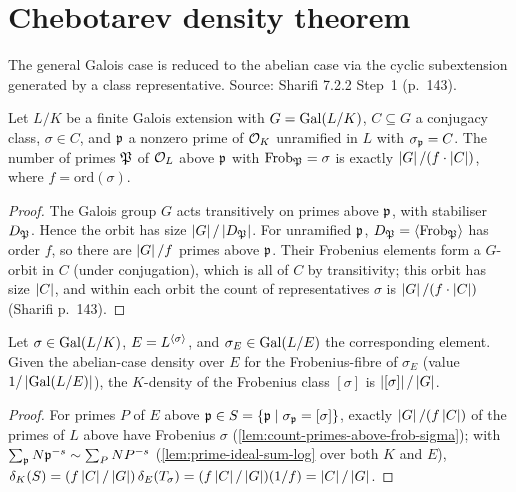 \section{Chebotarev density theorem}

The general Galois case is reduced to the abelian case via the cyclic
subextension generated by a class representative. Source: Sharifi 7.2.2
Step~1 (p.~143).

\begin{lemma}\label{lem:count-primes-above-frob-sigma}
  Let $L/K$ be a finite Galois extension with $G=\mathrm{Gal}(L/K)$,
  $C\subseteq G$ a conjugacy class, $\sigma\in C$, and $\mathfrak{p}$ a nonzero
  prime of $\mathcal{O}_K$ unramified in $L$ with $\sigma_{\mathfrak{p}} = C$. The number
  of primes $\mathfrak{P}$ of $\mathcal{O}_L$ above $\mathfrak{p}$ with $\mathrm{Frob}_{\mathfrak{P}} = \sigma$
  is exactly $\left\lvert G \right\rvert/(f\cdot\left\lvert C \right\rvert)$, where $f = \mathrm{ord}(\sigma)$.
\end{lemma}

\begin{proof}
  The Galois group $G$ acts transitively on primes above $\mathfrak{p}$, with
  stabiliser $D_{\mathfrak{P}}$. Hence the orbit has size $\left\lvert G \right\rvert/\left\lvert D_{\mathfrak{P}} \right\rvert$. For
  unramified $\mathfrak{p}$, $D_{\mathfrak{P}}=\left\langle \mathrm{Frob}_{\mathfrak{P}} \right\rangle$ has order $f$, so there are
  $\left\lvert G \right\rvert/f$ primes above $\mathfrak{p}$. Their Frobenius elements form a
  $G$-orbit in $C$ (under conjugation), which is all of $C$ by
  transitivity; this orbit has size $\left\lvert C \right\rvert$, and within each orbit
  the count of representatives $\sigma$ is $\left\lvert G \right\rvert/(f\cdot\left\lvert C \right\rvert)$
  (Sharifi p.~143).
\end{proof}

\begin{lemma}\label{lem:density-lift-fixedfield}
  Let $\sigma\in\mathrm{Gal}(L/K)$, $E = L^{\left\langle \sigma \right\rangle}$, and $\sigma_E\in\mathrm{Gal}(L/E)$
  the corresponding element. Given the abelian-case density over $E$ for
  the Frobenius-fibre of $\sigma_E$ (value $1/\left\lvert \mathrm{Gal}(L/E) \right\rvert$), the
  $K$-density of the Frobenius class $[\sigma]$ is $\left\lvert [\sigma] \right\rvert/\left\lvert G \right\rvert$.
\end{lemma}

\begin{proof}
  For primes $P$ of $E$ above $\mathfrak{p}\in S = \left\{ \mathfrak{p} \;\middle|\; \sigma_{\mathfrak{p}} = [\sigma] \right\}$,
  exactly $\left\lvert G \right\rvert/(f\left\lvert C \right\rvert)$ of the primes of $L$ above have Frobenius
  $\sigma$ (\cref{lem:count-primes-above-frob-sigma}); with $\sum_{\mathfrak{p}}
  N\mathfrak{p}^{-s} \sim \sum_P NP^{-s}$ (\cref{lem:prime-ideal-sum-log} over both
  $K$ and $E$), $\delta_K(S) = (f\left\lvert C \right\rvert/\left\lvert G \right\rvert)\,\delta_E(T_\sigma) =
  (f\left\lvert C \right\rvert/\left\lvert G \right\rvert)(1/f) = \left\lvert C \right\rvert/\left\lvert G \right\rvert$.
\end{proof}

